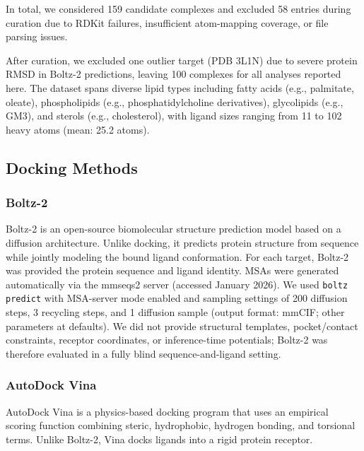 \documentclass[journal=jcisd8,manuscript=article]{achemso}
\begin{document}
In total, we considered 159 candidate complexes and excluded 58 entries during curation due to RDKit failures, insufficient atom-mapping coverage, or file parsing issues.

After curation, we excluded one outlier target (PDB 3L1N) due to severe protein RMSD in Boltz-2 predictions, leaving 100 complexes for all analyses reported here.
The dataset spans diverse lipid types including fatty acids (e.g., palmitate, oleate), phospholipids (e.g., phosphatidylcholine derivatives), glycolipids (e.g., GM3), and sterols (e.g., cholesterol), with ligand sizes ranging from 11 to 102 heavy atoms (mean: 25.2 atoms).

\subsection{Docking Methods}

\subsubsection{Boltz-2}

Boltz-2 is an open-source biomolecular structure prediction model based on a diffusion architecture.\cite{passaro2025boltz2,wohlwend2024boltz}
Unlike docking, it predicts protein structure from sequence while jointly modeling the bound ligand conformation.
For each target, Boltz-2 was provided the protein sequence and ligand identity.
MSAs were generated automatically via the mmseqs2 server (accessed January 2026).\cite{mirdita2022colabfold}
We used \texttt{boltz predict} with MSA-server mode enabled and sampling settings of 200 diffusion steps, 3 recycling steps, and 1 diffusion sample (output format: mmCIF; other parameters at defaults).
We did not provide structural templates, pocket/contact constraints, receptor coordinates, or inference-time potentials; Boltz-2 was therefore evaluated in a fully blind sequence-and-ligand setting.

\subsubsection{AutoDock Vina}

AutoDock Vina is a physics-based docking program that uses an empirical scoring function combining steric, hydrophobic, hydrogen bonding, and torsional terms.\cite{trott2010autodock}
Unlike Boltz-2, Vina docks ligands into a rigid protein receptor.
\end{document}
